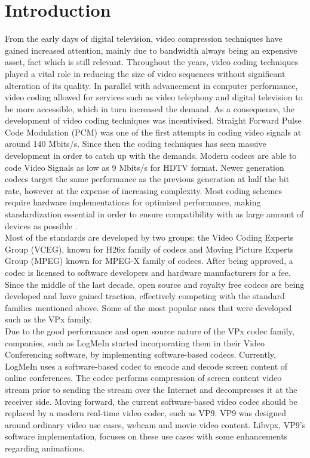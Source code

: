 \documentclass[a4paper,11pt,oneside]{article}
\begin{document}
\section{Introduction}
\indent From the early days of digital television, video compression techniques have gained increased attention, mainly due to bandwidth always being
an expensive asset, fact which is still relevant. Throughout the years, video coding techniques played a vital role in reducing the size of video sequences without significant alteration of its quality. In parallel with advancement in computer performance, video coding allowed for services such as video telephony and digital television to be more accessible, which in turn increased the demand. As a consequence, the development of video coding techniques was incentivised.
Straight Forward Pulse Code Modulation (PCM) was one of the first attempts in coding video signals at around 140 Mbits/s. Since then the coding techniques has seen massive development in order to catch up with the demands. Modern codecs are able to code Video Signals as low as 9 Mbits/s for HDTV format. Newer generation codecs target the same performance as the previous generation at half the  bit rate, however at the expense of increasing complexity. Most coding schemes require hardware implementations for optimized performance, making standardization essential in order to ensure compatibility with as large amount of devices
as possible \cite{ghanbari2011standard} . \\
\indent Most of the standards are developed by two groups: the Video Coding Experts Group (VCEG), known for H26x family of codecs and Moving Picture Experts Group (MPEG) known for MPEG-X family of codecs. After being approved, a codec is licensed to software developers and hardware manufacturers for a fee. Since the middle of the last decade, open source and royalty free codecs are being developed and have gained traction, effectively competing with the standard families mentioned above. Some of the most popular ones that were developed such as the VPx family. \\
\indent Due to the good performance and open source nature of the VPx codec family, companies, such as LogMeIn started incorporating them in their Video Conferencing software, by implementing software-based codecs. Currently, LogMeIn uses a software-based codec to encode and decode screen content of online conferences. The codec performs compression of screen content video stream prior to sending the stream over the Internet and decompresses it at the receiver side. Moving forward, the current software-based video codec should be replaced by a modern real-time video codec, such as VP9. VP9 was designed around ordinary video use cases, webcam and movie video content. Libvpx, VP9’s software implementation, focuses on these use cases with some enhancements regarding animations. 
\end{document}
